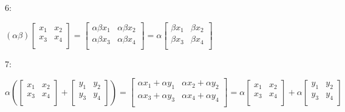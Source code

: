 \begin{parts}
\begin{solution}
		6:\\
		\begin{center}
		$
		\left(
        \alpha \beta
        \right) 
        \begin{bmatrix}
			    x_1 & x_2 \\
			    x_3 & x_4 \\
		    \end{bmatrix}
		    =
		    \begin{bmatrix}
			    \alpha \beta x_1 & \alpha \beta x_2 \\
			    \alpha \beta x_3 & \alpha \beta x_4 \\
		    \end{bmatrix}
		    =
		    \alpha
		    \begin{bmatrix}
			    \beta x_1 & \beta x_2 \\
			    \beta x_3 & \beta x_4 \\
		    \end{bmatrix}
		    $
		\end{center}

		7:\\
		\begin{center}
		$
		    \alpha \left( 
		        \begin{bmatrix}
			    x_1 & x_2 \\
			    x_3 & x_4 \\
		    \end{bmatrix}
		    +
		    \begin{bmatrix}
			    y_1 & y_2 \\
			    y_3 & y_4 \\
		    \end{bmatrix}
		    \right)
		    =
		    \begin{bmatrix}
			    \alpha x_1 + \alpha y_1 & \alpha x_2 + \alpha y_2 \\
			    \alpha x_3 + \alpha y_3 & \alpha x_4 + \alpha y_4 \\
		    \end{bmatrix}
		    =
		    \alpha
		    \begin{bmatrix}
			    x_1 & x_2 \\
			    x_3 & x_4 \\
		    \end{bmatrix}
		    +
		    \alpha
		    \begin{bmatrix}
			    y_1 & y_2 \\
			    y_3 & y_4 \\
		    \end{bmatrix}
		    $
		\end{center}
		

\end{solution}
\end{parts}
